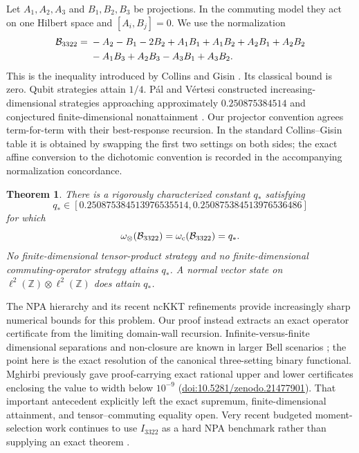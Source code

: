 \documentclass[11pt]{article}
\newtheorem{theorem}{Theorem}
\newcommand{\B}{\mathcal B_{3322}}
\begin{document}
Let $A_1,A_2,A_3$ and $B_1,B_2,B_3$ be projections.  In the commuting model
they act on one Hilbert space and $[A_i,B_j]=0$.  We use the normalization
\begin{align}
\B={}&-A_2-B_1-2B_2
 +A_1B_1+A_1B_2+A_2B_1+A_2B_2 \notag\\
&-A_1B_3+A_2B_3-A_3B_1+A_3B_2 .                 \label{eq:bell}
\end{align}
This is the inequality introduced by Collins and Gisin
\cite{CollinsGisin2004}.  Its classical bound is zero.  Qubit strategies
attain $1/4$.  P\'al and V\'ertesi constructed increasing-dimensional
strategies approaching approximately $0.250875384514$ and conjectured
finite-dimensional nonattainment \cite{PalVertesi2010}.
Our projector convention agrees term-for-term with their best-response
recursion.  In the standard Collins--Gisin table it is obtained by swapping
the first two settings on both sides; the exact affine conversion to the
dichotomic convention is recorded in the accompanying normalization
concordance.

\begin{theorem}\label{thm:main}
There is a rigorously characterized constant $q_*$ satisfying
\begin{equation}
q_*\in[0.250875384513976535514,0.250875384513976536486] \label{eq:qinterval}
\end{equation}
for which
\[
\omega_{\otimes}(\B)=\omega_{\rm c}(\B)=q_*.
\]
No finite-dimensional tensor-product strategy and no finite-dimensional
commuting-operator strategy attains $q_*$.  A normal vector state on
$\ell^2(\mathbb Z)\otimes\ell^2(\mathbb Z)$ does attain $q_*$.
\end{theorem}

The NPA hierarchy \cite{NPA2008} and its recent ncKKT refinements
\cite{AraujoEtAl2026} provide increasingly sharp numerical bounds for this
problem.  Our proof instead extracts an exact operator certificate from the
limiting domain-wall recursion.  Infinite-versus-finite dimensional
separations and non-closure are known in larger Bell scenarios
\cite{Slofstra2017,ColadangeloStark2018}; the point here is the exact resolution
of the canonical three-setting binary functional.
Mghirbi previously gave proof-carrying exact rational upper and lower
certificates enclosing the value to width below $10^{-9}$
\cite{Mghirbi2026}
(\href{https://doi.org/10.5281/zenodo.21477901}{doi:10.5281/zenodo.21477901}).
That important antecedent explicitly left the exact
supremum, finite-dimensional attainment, and tensor--commuting equality open.
Very recent budgeted moment-selection work continues to use $I_{3322}$ as a
hard NPA benchmark rather than supplying an exact theorem
\cite{FloraEtAl2026}.
\end{document}
